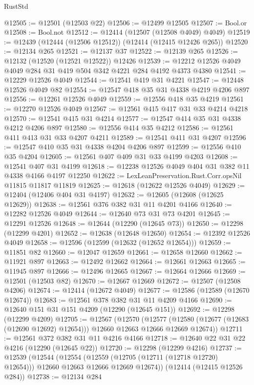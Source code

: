 \begin{lexlean}{RustStd}
\begin{coremodule}
{\begin{coremodule}
{{{{{{{{{{{{{{{{{{{{{{{{{{{{{{{{{{{{{{{{{{{{{{{{{{@12505 := @12501 (@12503 @22)
@12506 := @12499 @12505
@12507 := Bool.or
@12508 := Bool.not
@12512 := @12414 (@12507 (@12508 @4049) @4049)
@12519 := @12439 (@12444 (@12506 @12512)) (@12414 (@12415 @12426 @265))
@12520 := @12134 @265
@12521 := @12137 @37
@12522 := @12139 @265
@12526 := @12132 (@12520 (@12521 @12522)) @12426
@12539 := @12212 @12526 @4049 @4049 @284 @31 @419 @504 @342 @4221 @284 @4192 @4373 @4380
@12541 := @12229 @12526 @4049
@12544 := @12541 @419 @31 @4221
@12547 := @12448 @12526 @4049 @82
@12554 := @12547 @418 @35 @31 @4338 @4219 @4206 @897
@12556 := @12261 @12526 @4049
@12559 := @12556 @418 @35 @4219
@12561 := @12270 @12526 @4049
@12567 := @12561 @415 @417 @31 @33 @4214 @4218
@12570 := @12541 @415 @31 @4214
@12577 := @12547 @414 @35 @31 @4338 @4212 @4206 @897
@12580 := @12556 @414 @35 @4212
@12586 := @12561 @411 @413 @31 @33 @4207 @4211
@12589 := @12541 @411 @31 @4207
@12596 := @12547 @410 @35 @31 @4338 @4204 @4206 @897
@12599 := @12556 @410 @35 @4204
@12605 := @12561 @407 @409 @31 @33 @4199 @4203
@12608 := @12541 @407 @31 @4199
@12618 := @12238 @12526 @4049 @404 @31 @382 @11 @4338 @4166 @4197 @12250
@12622 := LexLeanPreservation.Rust.Corr.opsNil @11815 @11817 @11819
@12625 := @12618 (@12622 @12526 @4049)
@12629 := @12404 (@12406 @404 @31 @4197)
@12632 := @12605 (@12608 (@12625 @12629))
@12638 := @12561 @376 @382 @31 @11 @4201 @4166
@12640 := @12282 @12526 @4049
@12644 := @12640 @73 @31 @73 @4201
@12645 := @12291 @12526
@12648 := @12644 (@12290 (@12645 @73))
@12650 := @12298 (@12299 @4201)
@12652 := @12638 (@12648 @12650)
@12654 := @12392 @12526 @4049
@12658 := @12596 (@12599 (@12632 (@12652 @12654)))
@12659 := @11851 @82
@12660 := @12047 @12659
@12661 := @12658 @12660
@12662 := @11921 @897
@12663 := @12492 @12662
@12664 := @12661 @12663
@12665 := @11945 @897
@12666 := @12496 @12665
@12667 := @12664 @12666
@12669 := @12501 (@12503 @82)
@12670 := @12667 @12669
@12672 := @12507 (@12508 @4206)
@12674 := @12414 (@12672 @4049)
@12677 := @12586 (@12589 (@12670 @12674))
@12683 := @12561 @378 @382 @31 @11 @4209 @4166
@12690 := @12640 @151 @31 @151 @4209 (@12290 (@12645 @151))
@12692 := @12298 (@12299 @4209)
@12705 := @12567
    (@12570
      (@12577 (@12580 (@12677 (@12683 (@12690 @12692) @12654))) @12660 @12663 @12666 @12669 @12674))
@12711 := @12561 @372 @382 @31 @11 @4216 @4166
@12718 := @12640 @22 @31 @22 @4216 (@12290 (@12645 @22))
@12720 := @12298 (@12299 @4216)
@12737 := @12539
    (@12544
      (@12554 (@12559 (@12705 (@12711 (@12718 @12720) @12654))) @12660 @12663 @12666 @12669 @12674))
    (@12414 (@12415 @12526 @284))
@12738 := @12134 @284
}}}}}}}}}}}}}}}}}}}}}}}}}}}}}}}}}}}}}}}}}}}}}}}}}}
\end{coremodule}}
\end{coremodule}
\end{lexlean}
